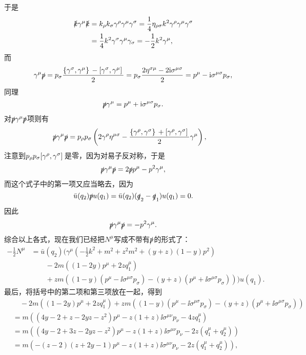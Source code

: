 于是
\[
    \begin{aligned}
        \slashed{k} \gamma^\mu \slashed{k} &= k_\rho k_\sigma \gamma^\rho \gamma^\mu \gamma^\sigma = \frac{1}{4} \eta_{\rho \sigma} k^2 \gamma^\rho \gamma^\mu \gamma^\sigma \\
        &= \frac{1}{4} k^2 \gamma^\sigma \gamma^\mu \gamma_\sigma = - \frac{1}{2} k^2 \gamma^\mu,
    \end{aligned}
\]
而
\[
    \gamma^\mu \slashed{p} = p_\sigma \frac{\acomm*{\gamma^\sigma}{\gamma^\mu} - \comm*{\gamma^\sigma}{\gamma^\mu}}{2} = p_\sigma \frac{2 \eta^{\sigma \mu} - 2 \ii \sigma^{\mu \sigma}}{2} = p^\mu - \ii \sigma^{\mu \sigma} p_\sigma,
\]
同理
\[
    \slashed{p} \gamma^\mu = p^\mu + \mathrm{i} \sigma^{\mu \sigma} p_\sigma.
\]
对$\slashed{p} \gamma^\mu \slashed{p}$项则有
\[
    \begin{aligned}
        \slashed{p} \gamma^\mu \slashed{p} &= p_\rho p_\sigma \left( 2 \gamma^\rho \eta^{\mu \sigma} - \frac{\acomm*{\gamma^\rho}{\gamma^\sigma} + \comm*{\gamma^\rho}{\gamma^\sigma}}{2} \gamma^\mu \right),
    \end{aligned}
\]
注意到$p_\rho p_\sigma \comm*{\gamma^\rho}{\gamma^\sigma}$是零，因为对易子反对称，于是
\[
    \slashed{p} \gamma^\mu \slashed{p} = 2 \slashed{p} p^\mu - p^2 \gamma^\mu,
\]
而这个式子中的第一项又应当略去，因为
\[
    \bar{u}(q_2) \slashed{p} u(q_1) = \bar{u}(q_2) (\slashed{q}_2 - \slashed{q}_1) u(q_1) = 0.
\]
因此
\[
    \slashed{p} \gamma^\mu \slashed{p} = - p^2 \gamma^\mu.
\]
综合以上各式，现在我们已经把$N^\mu$写成不带有$\slashed{p}$的形式了：
\begin{equation}
    \begin{aligned}
        - \frac{1}{2} N^\mu &= \bar{u}(q_2) (
            \gamma^\mu (- \frac{1}{2} k^2 + m^2 + z^2 m^2 + (y+z)(1-y) p^2) \\
            &\quad \quad - 2m ((1-2y) p^\mu + 2z q_1^\mu) \\
            &\quad \quad + zm((1-y) (p^\mu - \ii \sigma^{\mu \sigma} p_\sigma) - (y+z) (p^\mu + \ii \sigma^{\mu \sigma} p_\sigma))
        ) u(q_1).
    \end{aligned}
    \label{eq:no-slashed-p-n-mu}
\end{equation}
最后，将括号中的第二项和第三项放在一起，得到
\[
    \begin{aligned}
        &\quad - 2m ((1-2y) p^\mu + 2z q_1^\mu) + zm((1-y) (p^\mu - \ii \sigma^{\mu \sigma} p_\sigma) - (y+z) (p^\mu + \ii \sigma^{\mu \sigma} p_\sigma)) \\
        &= m((4y - 2 + z - 2yz - z^2) p^\mu - z(1+z) \ii \sigma^{\mu \nu} p_\nu - 4z q_1^\mu) \\
        &= m((4y - 2 + 3z - 2yz - z^2) p^\mu - z(1+z) \ii \sigma^{\mu \nu} p_\nu - 2z (q_1^\mu + q_2^\mu)) \\
        &= m(- (z-2)(z+2y-1) p^\mu - z(1+z) \ii \sigma^{\mu \nu} p_\nu - 2z (q_1^\mu + q_2^\mu)) ,
    \end{aligned}
\]
